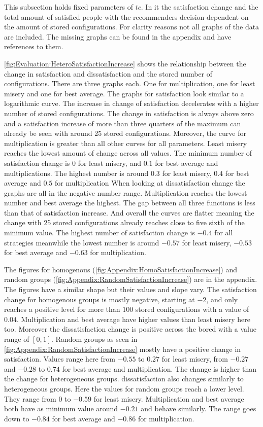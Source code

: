This subsection holds fixed parameters of $tc$. In it the satisfaction change and the total amount of satisfied people with the recommenders decision dependent on the amount of stored configurations. For clarity reasons not all graphs of the data are included. The missing graphs can be found in the appendix and have references to them.

\autoref{fig:Evaluation:HeteroSatisfactionIncrease} shows the relationship between the change in satisfaction and dissatisfaction and the stored number of configurations. There are three graphs each. One for multiplication, one for least misery and one for best average. The graphs for satisfaction look similar to a logarithmic curve. The increase in change of satisfaction decelerates with a higher number of stored configurations. The change in satisfaction is always above zero and a satisfaction increase of more than three quarters of the maximum can already be seen with around 25 stored configurations. Moreover, the curve for multiplication is greater than all other curves for all parameters. Least misery reaches the lowest amount of change across all values. The minimum number of satisfaction change is $0$ for least misery, and $0.1$ for best average and multiplications. The highest number is around $0.3$ for least misery, $0.4$ for best average and $0.5$ for multiplication
When looking at dissatisfaction change the graphs are all in the negative number range. Multiplication reaches the lowest number and best average the highest. The gap between all three functions is less than that of satisfaction increase. And overall the curves are flatter meaning the change with 25 stored configurations already reaches close to five sixth of the minimum value. The highest number of satisfaction change is $-0.4$ for all strategies meanwhile the lowest number is around $-0.57$ for least misery, $-0.53$ for best average and $-0.63$ for multiplication.

The figures for homogenous (\autoref{fig:Appendix:HomoSatisfactionIncrease}) and random groups (\autoref{fig:Appendix:RandomSatisfactionIncrease}) are in the appendix. The figures have a similar shape but their values and slope vary. The satisfaction change for homogenous groups is mostly negative, starting at $-2$, and only reaches a positive level for more than $100$ stored configurations with a value of $0.04$. Multiplication and best average have higher values than least misery here too. Moreover the dissatisfaction change is positive across the bored with a value range of $[0,1]$.
Random groups as seen in \autoref{fig:Appendix:RandomSatisfactionIncrease} mostly have a positive change in satisfaction. Values range here from $-0.55$ to $0.27$ for least misery, from $-0.27$ and $-0.28$ to $0.74$ for best average and multiplication. The change is higher than the change for heterogeneous groups. dissatisfaction also changes similarly to heterogeneous groups. Here the values for random groups reach a lower level. They range from $0$ to $-0.59$ for least misery. Multiplication and best average both have as minimum value around $-0.21$ and behave similarly. The range goes down to $-0.84$ for best average and $-0.86$ for multiplication.

